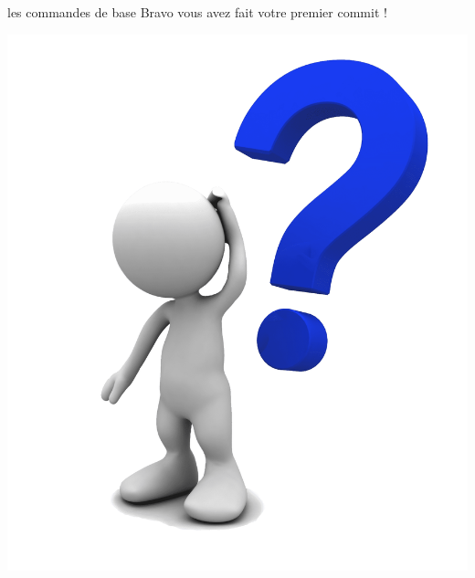 \documentclass[usenames,dvipsnames]{beamer}
\begin{document}
\begin{frame}[fragile]{les commandes de base}
	Bravo vous avez fait votre premier commit !
	\pause
	\begin{center}
		\includegraphics[width=0.5\linewidth]{Im/question-mark.png}
	\end{center}
\end{frame}
\end{document}
